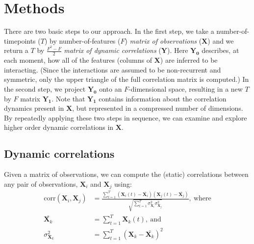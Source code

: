 \documentclass[english]{article}
\begin{document}
\section*{Methods}
There are two basic steps to our approach.  In the first step, we take
a number-of-timepoints ($T$) by number-of-features ($F$)
\textit{matrix of observations} ($\mathbf{X}$) and we return a $T$ by
$\frac{F^2 - F}{2}$ \textit{matrix of dynamic correlations}
($\mathbf{Y}$).  Here $\mathbf{Y_0}$ describes, at each moment, how
all of the features (columns of $\mathbf{X}$) are inferred to be
interacting.  (Since the interactions are assumed to be non-recurrent
and symmetric, only the upper triangle of the full correlation matrix
is computed.)  In the second step, we project $\mathbf{Y_0}$ onto an
$F$-dimensional space, resulting in a new $T$ by $F$ matrix
$\mathbf{Y_1}$.  Note that $\mathbf{Y_1}$ contains information about
the correlation dynamics present in $\mathbf{X}$, but represented in a
compressed number of dimensions.  By repeatedly applying these two
steps in sequence, we can examine and explore higher order dynamic
correlations in $\mathbf{X}$.

\subsection*{Dynamic correlations}
Given a matrix of observations, we can compute the (static)
correlations between any pair of observations, $\mathbf{X}_i$ and
$\mathbf{X}_j$ using:
\begin{align}
  \mathrm{corr}(\mathbf{X}_i, \mathbf{X}_j) &= \frac{\sum_{t=1}^T \left(\mathbf{X}_i(t)
                                              -
                                              \bar{\mathbf{X}_i}\right) \left(\mathbf{X}_j(t)
                                              -
                                              \bar{\mathbf{X}_j}\right)}{\sqrt{\sum_{t=1}^T
                                              \sigma^2_{\mathbf{X}_i} 
                                              \sigma^2_{\mathbf{X}_j}}},~\mathrm{where}\\\label{eqn:corr}
  \bar{\mathbf{X}_k} &= \sum_{t=1}^T
                       \mathbf{X}_k(t),~\mathrm{and}\\
  \sigma^2_{\mathbf{X}_k} &= \sum_{t=1}^T \left( \mathbf{X}_k -
                            \bar{\mathbf{X}_k} \right)^2 
\end{align}
\end{document}
